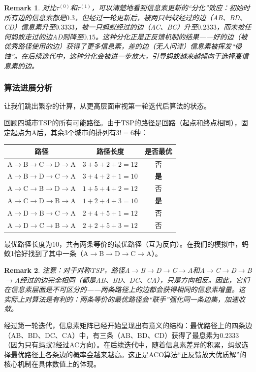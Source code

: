 \documentclass[lang=cn,zihao=-4,a4paper,fontset=windows]{beautybook}
\newtheorem*{remark}{\textbf{Remark}}
\begin{document}
\begin{remark}
对比$\tau^{(0)}$和$\tau^{(1)}$，可以清楚地看到信息素更新的“分化”效应：初始时所有边的信息素都是$0.3$，但经过一轮更新后，被两只蚂蚁经过的边（AB、BD、CD）信息素升至$0.3333$，被一只蚂蚁经过的边（AC、BC）升至$0.2333$，而未被任何蚂蚁走过的边AD则降至$0.15$。这种分化正是正反馈机制的结果——好的边（被优秀路径使用的边）获得了更多信息素，差的边（无人问津）信息素被挥发“侵蚀”。在后续迭代中，这种分化会被进一步放大，引导蚂蚁越来越倾向于选择高信息素的边。
\end{remark}

\subsubsection{算法进展分析}

让我们跳出繁杂的计算，从更高层面审视第一轮迭代后算法的状态。

回顾四城市TSP的所有可能路径。由于TSP的路径是回路（起点和终点相同），固定起点为A后，其余3个城市的排列有$3!=6$种：

\begin{center}
\begin{tabular}{ccc}
\toprule
路径 & 路径长度 & 是否最优 \\
\midrule
A$\to$B$\to$C$\to$D$\to$A & $3+5+2+2=12$ & 否 \\
A$\to$B$\to$D$\to$C$\to$A & $3+4+2+1=10$ & \textbf{是} \\
A$\to$C$\to$B$\to$D$\to$A & $1+5+4+2=12$ & 否 \\
A$\to$C$\to$D$\to$B$\to$A & $1+2+4+3=10$ & \textbf{是} \\
A$\to$D$\to$B$\to$C$\to$A & $2+4+5+1=12$ & 否 \\
A$\to$D$\to$C$\to$B$\to$A & $2+2+5+3=12$ & 否 \\
\bottomrule
\end{tabular}
\end{center}

最优路径长度为$10$，共有两条等价的最优路径（互为反向）。在我们的模拟中，蚂蚁1恰好找到了其中一条（A$\to$B$\to$D$\to$C$\to$A）。

\begin{remark}
注意：对于对称TSP，路径A$\to$B$\to$D$\to$C$\to$A和A$\to$C$\to$D$\to$B$\to$A经过的边完全相同（都是AB、BD、DC、CA），只是方向相反。因此，它们在信息素层面是不可区分的——两条路径上的边都会获得相同的信息素增量。这实际上对算法是有利的：两条等价的最优路径会“联手”强化同一条边集，加速收敛。
\end{remark}

经过第一轮迭代，信息素矩阵已经开始呈现出有意义的结构：最优路径上的四条边（AB、BD、DC、CA）中，有三条（AB、BD、CD）获得了最息素为$0.2333$（因为只有蚂蚁2经过AC方向）。在后续迭代中，随着信息素差异的积累，蚂蚁选择最优路径上各条边的概率会越来越高。这正是ACO算法“正反馈放大优质解”的核心机制在具体数值上的体现。
\end{document}
